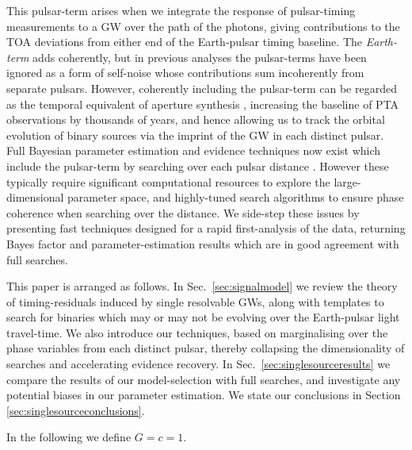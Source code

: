 \documentclass[prd,twocolumn,showpacs,nofootinbib]{revtex4}
\begin{document}
This pulsar-term arises when we integrate the response of pulsar-timing measurements to a GW over the path of the photons, giving contributions to the TOA deviations from either end of the Earth-pulsar timing baseline. 
The {\it Earth-term} adds coherently, but in previous analyses the pulsar-terms have been ignored as a form of self-noise whose contributions sum incoherently from separate pulsars. However, coherently including the pulsar-term can be regarded as the temporal equivalent of aperture synthesis \citep{corbin-cornish-2010}, increasing the baseline of PTA observations by thousands of years, and hence allowing us to track the orbital evolution of binary sources via the imprint of the GW in each distinct pulsar. Full Bayesian parameter estimation and evidence techniques now exist which include the pulsar-term by searching over each pulsar distance \citep{ellisbayesian2013}. However these typically require significant computational resources to explore the large-dimensional parameter space, and highly-tuned search algorithms to ensure phase coherence when searching over the distance. We side-step these issues by presenting fast techniques designed for a rapid first-analysis of the data, returning Bayes factor and parameter-estimation results which are in good agreement with full searches.

This paper is arranged as follows. In Sec.\ \ref{sec:signalmodel} we review the theory of timing-residuals induced by single resolvable GWs, along with templates to search for binaries which may or may not be evolving over the Earth-pulsar light travel-time. We also introduce our techniques, based on marginalising over the phase variables from each distinct pulsar, thereby collapsing the dimensionality of searches and accelerating evidence recovery. In Sec.\ \ref{sec:singlesourceresults} we compare the results of our model-selection with full searches, and investigate any potential biases in our parameter estimation. We state our conclusions in Section \ref{sec:singlesourceconclusions}.

In the following we define $G=c=1$.




\end{document}
